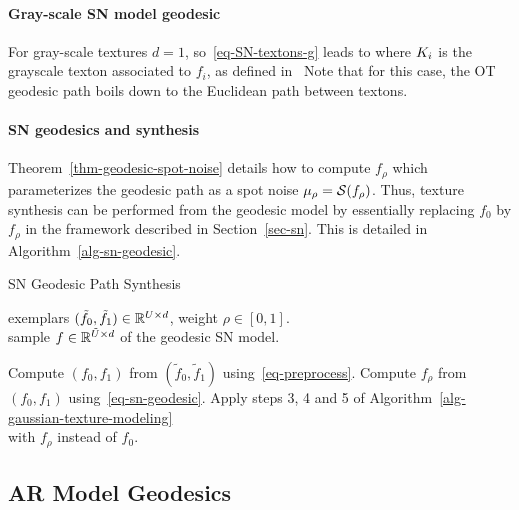 \paragraph{Gray-scale SN model geodesic}


For gray-scale textures $d=1$, so~\eqref{eq-SN-textons-g} leads to
where $K_i$ is the grayscale texton associated to $f_i$, as defined in~\cite{Desolneux-Moisan-12}
Note that for this case, the OT geodesic path boils down to the Euclidean path between textons.

\paragraph{SN geodesics and synthesis} Theorem~\ref{thm-geodesic-spot-noise} details how to compute $f_\rho$ which parameterizes the geodesic path as a spot noise $\mu_\rho = \mathcal{S}(f_\rho)$. Thus, texture synthesis can be performed from the geodesic model by essentially replacing $f_0$ by $f_\rho$ in the framework described in Section~\ref{sec-sn}. This is detailed in Algorithm~\ref{alg-sn-geodesic}.


\begin{algorithm}[ht!]
\caption{SN Geodesic Path Synthesis}
\label{alg-sn-geodesic}
\Require exemplars $(\tilde f_0, \tilde f_1) \in \mathbb{R}^{U \times d}$, weight $\rho \in [0,1]$. \\
\Ensure sample $f \in \mathbb{R}^{\tilde U \times d}$ of the geodesic SN model.
\begin{enumerate}
	 Compute $(f_0,f_1)$ from $(\tilde f_0, \tilde f_1)$
			using~\eqref{eq-preprocess}.
	 Compute $f_\rho$ from $(f_0,f_1)$ using~\eqref{eq-sn-geodesic}.
	 Apply steps 3, 4 and 5 of Algorithm~\ref{alg-gaussian-texture-modeling} \\
		with $f_\rho$ instead of $f_0$.
\end{enumerate}
\end{algorithm}




\subsection{AR Model Geodesics}
\label{subsec-ar-geodesic}

